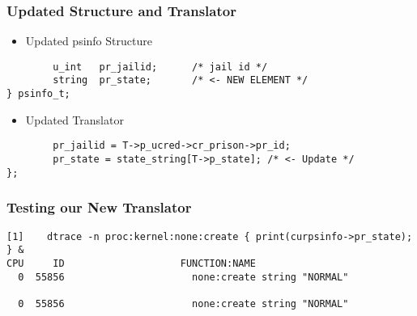 \documentclass[pdftex]{beamer}
\begin{document}
\begin{frame}[fragile]
  \frametitle{Updated Structure and Translator}
  \begin{itemize}
  \item Updated psinfo Structure
  \end{itemize}
\begin{lstlisting}
        u_int   pr_jailid;      /* jail id */
        string  pr_state;       /* <- NEW ELEMENT */
} psinfo_t;
\end{lstlisting}
  \begin{itemize}
  \item Updated Translator
  \end{itemize}
\begin{lstlisting}
        pr_jailid = T->p_ucred->cr_prison->pr_id;
        pr_state = state_string[T->p_state]; /* <- Update */
};
\end{lstlisting}
\end{frame}

\begin{frame}[fragile]
  \frametitle{Testing our New Translator}
\begin{lstlisting}
[1]    dtrace -n proc:kernel:none:create { print(curpsinfo->pr_state); } &
CPU     ID                    FUNCTION:NAME
  0  55856                      none:create string "NORMAL"

  0  55856                      none:create string "NORMAL"
\end{lstlisting}
\end{frame}
\end{document}
